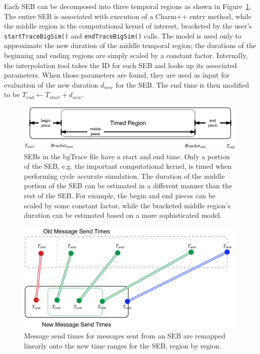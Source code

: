 Each SEB can be decomposed into three temporal regions as shown in Figure~\ref{event_diagram}. 
The entire SEB is associated with execution of a Charm++ entry method, while the middle region
is the computational kernel of interest, bracketed by the user's \texttt{startTraceBigSim()} and  \texttt{endTraceBigSim()} calls. The model is used only to approximate the new duration of the middle temporal region;
the durations of the beginning and ending regions are simply scaled by a constant factor.
Internally, the interpolation tool takes the ID for each SEB and looks up its associated parameters.
When those parameters are found, they are used as input for evaluation of the new duration $d_{new}$
for the SEB. The end time is then modified to be $T_{end}\leftarrow  T_{start}+d_{new}$.

\begin{figure}
\centering
\includegraphics[width=5in]{figures/event_diagram}
\caption{SEBs in the bgTrace file have a start and end time. Only a portion of the SEB, e.g. the important computational kernel, is timed when performing cycle accurate simulation. The duration of the middle portion of the SEB can be estimated in a different manner than the rest of the SEB. For example, the begin and end pieces can be scaled by some constant factor, while the bracketed middle region's duration can be estimated based on a more
sophisticated model.
\label{event_diagram}}
\end{figure}

\begin{figure}
\centering
\includegraphics[width=6in]{figures/event_diagram2}
\caption{Message send times for messages sent from an SEB are remapped linearly onto the new time ranges for the 
SEB, region by region.
\label{event_diagram2}}
\end{figure}

